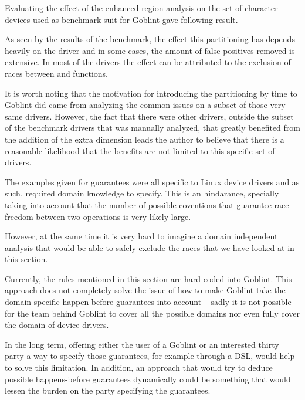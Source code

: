 \documentclass[..thesis.tex]{subfiles}
\begin{document}

Evaluating the effect of the enhanced region analysis on the set of character devices used as benchmark suit for Goblint gave following result.


As seen by the results of the benchmark, the effect this partitioning has depends heavily on the driver and in some cases, the amount of false-positives removed is extensive. 
In most of the drivers the effect can be attributed to the exclusion of races between  and  functions. 


It is worth noting that the motivation for introducing the partitioning by time  to Goblint did came from analyzing the common issues on a subset of those very same drivers.
However, the fact that there were other drivers, outside the subset of the benchmark drivers that was manually analyzed,
that greatly benefited from the addition of the extra dimension leads the author to believe that there is a reasonable likelihood
that the benefits are not limited to this specific set of drivers.


The examples given for guarantees were all specific to Linux device drivers and as such, required domain knowledge to specify. This is an hindarance,
specially taking into account that the number of possible coventions that guarantee race freedom between two operations is very likely large.  

However, at the same time it is very hard to imagine a domain independent analysis that would be able to safely exclude the races that we have looked at in this section.

Currently, the rules mentioned in this section are hard-coded into Goblint. This approach does not completely solve the issue of how to make Goblint take the domain specific happen-before
guarantees into account -- sadly it is not possible for the team behind Goblint to cover all the possible domains nor even fully cover the domain of device drivers.

In the long term, offering either the user of a Goblint or an interested thirty party a way to specify those guarantees,
for example through a DSL,  would help to solve this limitation. In addition, an approach that would try to deduce possible happens-before guarantees dynamically 
could be something that would lessen the burden on the party specifying the guarantees.

\end{document}
